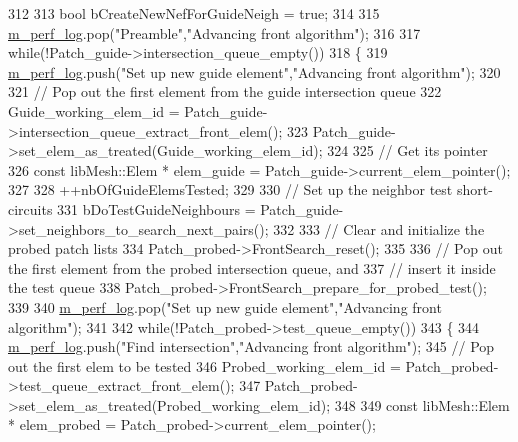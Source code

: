 \begin{DoxyCode}
312 
313         \textcolor{keywordtype}{bool} bCreateNewNefForGuideNeigh = \textcolor{keyword}{true};
314 
315         \hyperlink{classcarl_1_1_intersection___search_aebe6210287a36909206b1a59f9cd17e0}{m\_perf\_log}.pop(\textcolor{stringliteral}{"Preamble"},\textcolor{stringliteral}{"Advancing front algorithm"});
316 
317         \textcolor{keywordflow}{while}(!Patch\_guide->intersection\_queue\_empty())
318         \{
319             \hyperlink{classcarl_1_1_intersection___search_aebe6210287a36909206b1a59f9cd17e0}{m\_perf\_log}.push(\textcolor{stringliteral}{"Set up new guide element"},\textcolor{stringliteral}{"Advancing front algorithm"});
320 
321             \textcolor{comment}{// Pop out the first element from the guide intersection queue}
322             Guide\_working\_elem\_id = Patch\_guide->intersection\_queue\_extract\_front\_elem();
323             Patch\_guide->set\_elem\_as\_treated(Guide\_working\_elem\_id);
324 
325             \textcolor{comment}{// Get its pointer}
326             \textcolor{keyword}{const} libMesh::Elem * elem\_guide = Patch\_guide->current\_elem\_pointer();
327 
328             ++nbOfGuideElemsTested;
329 
330             \textcolor{comment}{// Set up the neighbor test short-circuits}
331             bDoTestGuideNeighbours = Patch\_guide->set\_neighbors\_to\_search\_next\_pairs();
332 
333             \textcolor{comment}{// Clear and initialize the probed patch lists}
334             Patch\_probed->FrontSearch\_reset();
335 
336             \textcolor{comment}{// Pop out the first element from the probed intersection queue, and}
337             \textcolor{comment}{// insert it inside the test queue}
338             Patch\_probed->FrontSearch\_prepare\_for\_probed\_test();
339 
340             \hyperlink{classcarl_1_1_intersection___search_aebe6210287a36909206b1a59f9cd17e0}{m\_perf\_log}.pop(\textcolor{stringliteral}{"Set up new guide element"},\textcolor{stringliteral}{"Advancing front algorithm"});
341 
342             \textcolor{keywordflow}{while}(!Patch\_probed->test\_queue\_empty())
343             \{
344                 \hyperlink{classcarl_1_1_intersection___search_aebe6210287a36909206b1a59f9cd17e0}{m\_perf\_log}.push(\textcolor{stringliteral}{"Find intersection"},\textcolor{stringliteral}{"Advancing front algorithm"});
345                 \textcolor{comment}{// Pop out the first elem to be tested}
346                 Probed\_working\_elem\_id = Patch\_probed->test\_queue\_extract\_front\_elem();
347                 Patch\_probed->set\_elem\_as\_treated(Probed\_working\_elem\_id);
348 
349                 \textcolor{keyword}{const} libMesh::Elem * elem\_probed = Patch\_probed->current\_elem\_pointer();

\end{DoxyCode}
